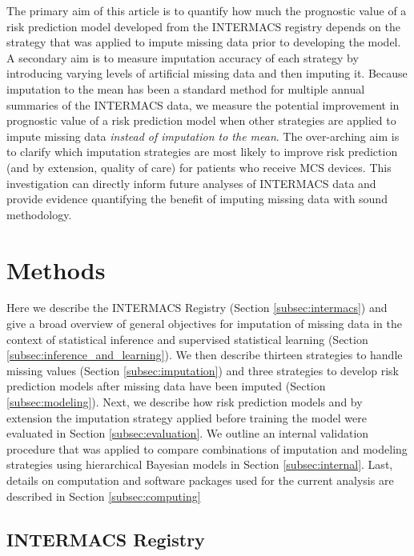 \documentclass{article}
\begin{document}
The primary aim of this article is to quantify how much the prognostic
value of a risk prediction model developed from the INTERMACS registry
depends on the strategy that was applied to impute missing data prior to
developing the model. A secondary aim is to measure imputation accuracy
of each strategy by introducing varying levels of artificial missing
data and then imputing it. Because imputation to the mean has been a
standard method for multiple annual summaries of the INTERMACS data, we
measure the potential improvement in prognostic value of a risk
prediction model when other strategies are applied to impute missing
data \emph{instead of imputation to the mean}. The over-arching aim is
to clarify which imputation strategies are most likely to improve risk
prediction (and by extension, quality of care) for patients who receive
MCS devices. This investigation can directly inform future analyses of
INTERMACS data and provide evidence quantifying the benefit of imputing
missing data with sound methodology.

\hypertarget{methods}{%
\section{Methods}\label{methods}}

\label{sec:methods}

Here we describe the INTERMACS Registry (Section \ref{subsec:intermacs})
and give a broad overview of general objectives for imputation of
missing data in the context of statistical inference and supervised
statistical learning (Section \ref{subsec:inference_and_learning}). We
then describe thirteen strategies to handle missing values (Section
\ref{subsec:imputation}) and three strategies to develop risk prediction
models after missing data have been imputed (Section
\ref{subsec:modeling}). Next, we describe how risk prediction models and
by extension the imputation strategy applied before training the model
were evaluated in Section \ref{subsec:evaluation}. We outline an
internal validation procedure that was applied to compare combinations
of imputation and modeling strategies using hierarchical Bayesian models
in Section \ref{subsec:internal}. Last, details on computation and
software packages used for the current analysis are described in Section
\ref{subsec:computing}

\hypertarget{intermacs-registry}{%
\subsection{INTERMACS Registry}\label{intermacs-registry}}
\end{document}
